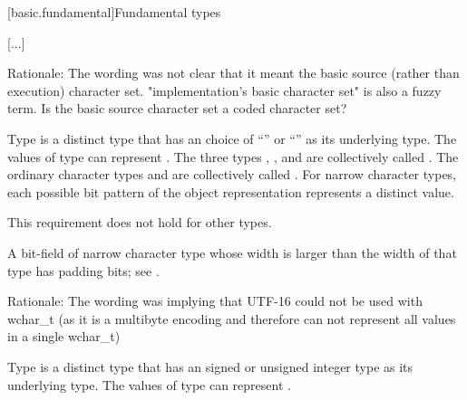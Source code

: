 \documentclass{wg21}
\begin{document}
[basic.fundamental]{Fundamental types}

[...]


\begin{quoteblock}
Rationale: The wording was not clear that it meant the basic source (rather than execution) character set.
"implementation's basic character set" is also a fuzzy term. Is the basic source character set a coded character set?
\end{quoteblock}


%
%
%
%
%
%
%
%
Type  is a distinct type
that has an  choice of
``'' or ``'' as its underlying type.
The values of type  can represent .
The three types , , and 
are collectively called
.
The ordinary character types and 
are collectively called .
For narrow character types,
each possible bit pattern of the object representation represents
a distinct value.
\begin{note}
 This requirement does not hold for other types.
\end{note}
\begin{note}
 A bit-field of narrow character type whose width is larger than
 the width of that type has padding bits; see .
\end{note}

\begin{quoteblock}
Rationale: The wording was implying that UTF-16 could not be used with wchar_t (as it is a multibyte encoding and therefore can not represent all values in a single wchar_t)
\end{quoteblock}


%
%
%
Type  is a distinct type that has
an 
signed or unsigned integer type as its underlying type.
The values of type  can represent
.
\end{document}
